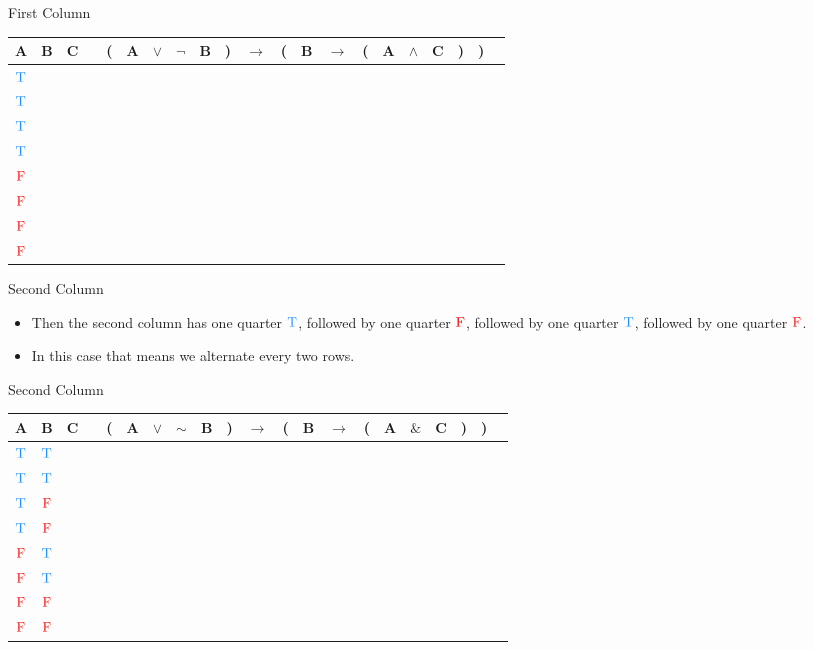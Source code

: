 \documentclass[
  ignorenonframetext,
]{beamer}
\providecommand{\tightlist}{%
  \setlength{\itemsep}{0pt}\setlength{\parskip}{0pt}}
\renewcommand{\,}{\text{, }}
\def\True{\textcolor{dodgerblue}{\text{T}}}
\def\False{\textcolor{red}{\text{F}}}
\begin{document}
\begin{frame}{First Column}
\protect\hypertarget{first-column}{}

\begin{center}
\begin{tabular}{@{ }c@{ }@{ }c@{ }@{ }c | c@{ }@{}c@{}@{ }c@{ }@{ }c@{ }@{ }c@{ }@{ }c@{ }@{}c@{}@{ }c@{ }@{}c@{}@{ }c@{ }@{ }c@{ }@{}c@{}@{ }c@{ }@{ }c@{ }@{ }c@{ }@{}c@{}@{}c@{}@{ }c}
A & B & C &  & ( & A & $\vee$ & $\neg$ & B & ) & $\rightarrow$ & ( & B & $\rightarrow$ & ( & A & $\wedge$ & C & ) & ) & \\
\hline 
 $\True$ & & \\
 $\True$ & & \\
 $\True$ & & \\
 $\True$ & & \\
 $\False$ & &\\
 $\False$ & &\\
 $\False$ & &\\
 $\False$ & &\\
\end{tabular}
\end{center}

\end{frame}

\begin{frame}{Second Column}
\protect\hypertarget{second-column}{}

\begin{itemize}
\tightlist
\item
  Then the second column has one quarter \(\True\), followed by one
  quarter \(\False\), followed by one quarter \(\True\), followed by one
  quarter \(\False\).
\item
  In this case that means we alternate every two rows.
\end{itemize}

\end{frame}

\begin{frame}{Second Column}
\protect\hypertarget{second-column-1}{}

\begin{center}
\begin{tabular}{@{ }c@{ }@{ }c@{ }@{ }c | c@{ }@{}c@{}@{ }c@{ }@{ }c@{ }@{ }c@{ }@{ }c@{ }@{}c@{}@{ }c@{ }@{}c@{}@{ }c@{ }@{ }c@{ }@{}c@{}@{ }c@{ }@{ }c@{ }@{ }c@{ }@{}c@{}@{}c@{}@{ }c}
A & B & C &  & ( & A & $\lor$ & $\sim$ & B & ) & $\rightarrow$ & ( & B & $\rightarrow$ & ( & A & $\&$ & C & ) & ) & \\
\hline 
 $\True$ & $\True$ &\\
 $\True$ & $\True$ &\\
 $\True$ & $\False$ &\\
 $\True$ & $\False$ & \\
 $\False$ & $\True$ &\\
 $\False$ & $\True$ &\\
 $\False$ & $\False$ &\\
 $\False$ & $\False$ &\\
\end{tabular}
\end{center}

\end{frame}
\end{document}
